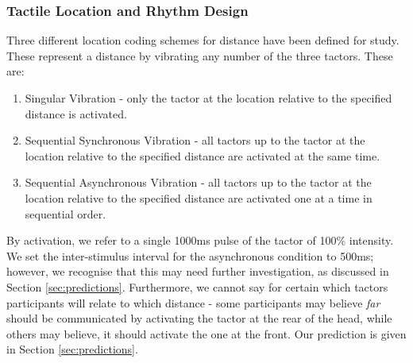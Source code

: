 \documentclass{interim}
\begin{document}
\subsubsection{Tactile Location and Rhythm Design}
Three different location coding schemes for distance have been defined for study. These represent a distance by vibrating any number of the three tactors. These are:
\begin{enumerate}
    \item Singular Vibration - only the tactor at the location relative to the specified distance is activated.
    \item Sequential Synchronous Vibration - all tactors up to the tactor at the location relative to the specified distance are activated at the same time.
    \item Sequential Asynchronous Vibration - all tactors up to the tactor at the location relative to the specified distance are activated one at a time in sequential order.
\end{enumerate}
By activation, we refer to a single 1000ms pulse of the tactor of 100\% intensity. We set the inter-stimulus interval for the asynchronous condition to 500ms; however, we recognise that this may need further investigation, as discussed in Section \ref{sec:predictions}. Furthermore, we cannot say for certain which tactors participants will relate to which distance - some participants may believe \textit{far} should be communicated by activating the tactor at the rear of the head, while others may believe, it should activate the one at the front. Our prediction is given in Section \ref{sec:predictions}.
\end{document}
